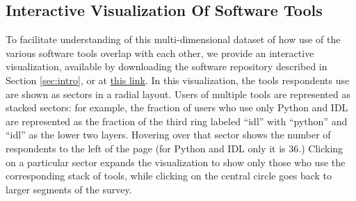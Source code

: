 \subsection{Interactive Visualization Of Software Tools}
\label{ssec:d3viz}

To facilitate understanding of this multi-dimensional dataset of how use of the various software tools overlap with each other, we provide an interactive visualization, available by downloading the software repository described in Section \ref{sec:intro}, or at \href{http://eteq.github.io/software_survey_analysis/software_tools_heirarchy_d3vis.html}{this link}. In this visualization, the tools respondents use are shown as sectors in a radial layout.  Users of multiple tools are represented as stacked sectors: for example, the fraction of users who use only Python and IDL are represented as the fraction of the third ring labeled ``idl'' with ``python'' and ``idl'' as the lower two layers.  Hovering over that sector shows the number of respondents to the left of the page (for Python and IDL only it is 36.)  Clicking on a particular sector expands the visualization to show only those who use the corresponding stack of tools, while clicking on the central circle goes back to larger segments of the survey.
  